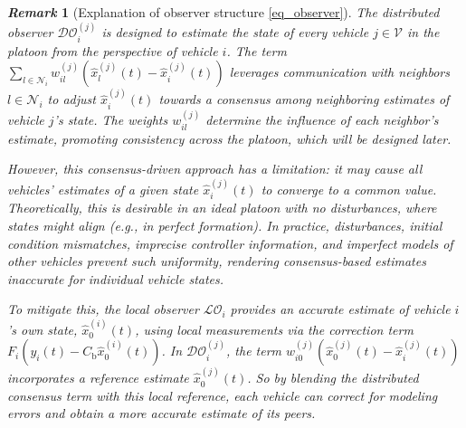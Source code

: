\documentclass[letterpaper, 10pt, conference]{ieeeconf}  %
\def\eqref#1{(\ref{#1})}
\def\LO{\mathcal{LO}} %
\def\DO{\mathcal{DO}} %
\newtheorem{remark}{\it Remark}%
\begin{document}
\begin{remark}[Explanation of observer structure \ref{eq_observer}]


  The distributed observer $\DO_i^{(j)}$ is designed to estimate the state of every vehicle $j \in \mathcal{V}$ in the platoon from the perspective of vehicle $i$. 
  The term $\sum_{l \in {\mathcal{N}}_i} w_{il}^{(j)} \left( \hat{x}_l^{(j)}(t) - \hat{x}_i^{(j)}(t) \right)$ leverages communication with neighbors $l \in {\mathcal{N}}_i$ to adjust $\hat{x}_i^{(j)}(t)$ towards a consensus among neighboring estimates of vehicle $j$'s state. The weights $w_{il}^{(j)}$ determine the influence of each neighbor's estimate, promoting consistency across the platoon, which will be designed later.

However, this consensus-driven approach has a limitation: it may cause all vehicles' estimates of a given state $\hat{x}_i^{(j)}(t)$ to converge to a common value. Theoretically, this is desirable in an ideal platoon with no disturbances, where states might align (e.g., in perfect formation). In practice, disturbances, initial condition mismatches, imprecise controller information, and imperfect models of other vehicles prevent such uniformity, rendering consensus-based estimates inaccurate for individual vehicle states.

To mitigate this, the local observer $\LO_i$ provides an accurate estimate of vehicle $i$'s own state, $\hat{x}_0^{(i)}(t)$, using local measurements via the correction term $F_i \left( y_i(t) - C_{\text{b}} \hat{x}_0^{(i)}(t) \right)$. In $\DO_i^{(j)}$, the term $w_{i0}^{(j)} \left( \hat{x}_0^{(j)}(t) - \hat{x}_i^{(j)}(t) \right)$ incorporates a reference estimate $\hat{x}_0^{(j)}(t)$. 
So by blending the distributed consensus term with this local reference, each vehicle can correct for modeling errors and obtain a more accurate estimate of its peers.




\end{remark}
\end{document}
